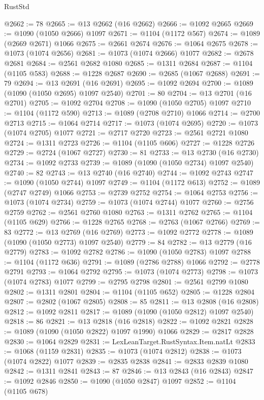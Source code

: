 \begin{lexlean}{RustStd}
\begin{coremodule}
@2662 := 78
@2665 := @13 @2662 (@16 @2662)
@2666 := @1092 @2665
@2669 := @1090 (@1050 @2666) @1097
@2671 := @1104 (@1172 @567)
@2674 := @1089 (@2669 @2671) @1066
@2675 := @2661 @2674
@2676 := @1064 @2675
@2678 := @1073 (@1074 @2656)
@2681 := @1073 (@1074 @2666) @1077
@2682 := @2678 @2681
@2684 := @2561 @2682 @1080
@2685 := @1311 @2684
@2687 := @1104 (@1105 @583)
@2688 := @1228 @2687
@2690 := @2685 (@1067 @2688)
@2691 := 79
@2694 := @13 @2691 (@16 @2691)
@2695 := @1092 @2694
@2700 := @1089 (@1090 (@1050 @2695) @1097 @2540)
@2701 := 80
@2704 := @13 @2701 (@16 @2701)
@2705 := @1092 @2704
@2708 := @1090 (@1050 @2705) @1097
@2710 := @1104 (@1172 @590)
@2713 := @1089 (@2708 @2710) @1066
@2714 := @2700 @2713
@2715 := @1064 @2714
@2717 := @1073 (@1074 @2695)
@2720 := @1073 (@1074 @2705) @1077
@2721 := @2717 @2720
@2723 := @2561 @2721 @1080
@2724 := @1311 @2723
@2726 := @1104 (@1105 @606)
@2727 := @1228 @2726
@2729 := @2724 (@1067 @2727)
@2730 := 81
@2733 := @13 @2730 (@16 @2730)
@2734 := @1092 @2733
@2739 := @1089 (@1090 (@1050 @2734) @1097 @2540)
@2740 := 82
@2743 := @13 @2740 (@16 @2740)
@2744 := @1092 @2743
@2747 := @1090 (@1050 @2744) @1097
@2749 := @1104 (@1172 @613)
@2752 := @1089 (@2747 @2749) @1066
@2753 := @2739 @2752
@2754 := @1064 @2753
@2756 := @1073 (@1074 @2734)
@2759 := @1073 (@1074 @2744) @1077
@2760 := @2756 @2759
@2762 := @2561 @2760 @1080
@2763 := @1311 @2762
@2765 := @1104 (@1105 @629)
@2766 := @1228 @2765
@2768 := @2763 (@1067 @2766)
@2769 := 83
@2772 := @13 @2769 (@16 @2769)
@2773 := @1092 @2772
@2778 := @1089 (@1090 (@1050 @2773) @1097 @2540)
@2779 := 84
@2782 := @13 @2779 (@16 @2779)
@2783 := @1092 @2782
@2786 := @1090 (@1050 @2783) @1097
@2788 := @1104 (@1172 @636)
@2791 := @1089 (@2786 @2788) @1066
@2792 := @2778 @2791
@2793 := @1064 @2792
@2795 := @1073 (@1074 @2773)
@2798 := @1073 (@1074 @2783) @1077
@2799 := @2795 @2798
@2801 := @2561 @2799 @1080
@2802 := @1311 @2801
@2804 := @1104 (@1105 @652)
@2805 := @1228 @2804
@2807 := @2802 (@1067 @2805)
@2808 := 85
@2811 := @13 @2808 (@16 @2808)
@2812 := @1092 @2811
@2817 := @1089 (@1090 (@1050 @2812) @1097 @2540)
@2818 := 86
@2821 := @13 @2818 (@16 @2818)
@2822 := @1092 @2821
@2828 := @1089 (@1090 (@1050 @2822) @1097 @1990) @1066
@2829 := @2817 @2828
@2830 := @1064 @2829
@2831 := LexLeanTarget.RustSyntax.Item.natLt
@2833 := @1068 (@1159 @2831)
@2835 := @1073 (@1074 @2812)
@2838 := @1073 (@1074 @2822) @1077
@2839 := @2835 @2838
@2841 := @2833 @2839 @1080
@2842 := @1311 @2841
@2843 := 87
@2846 := @13 @2843 (@16 @2843)
@2847 := @1092 @2846
@2850 := @1090 (@1050 @2847) @1097
@2852 := @1104 (@1105 @678)

\end{coremodule}
\end{lexlean}
